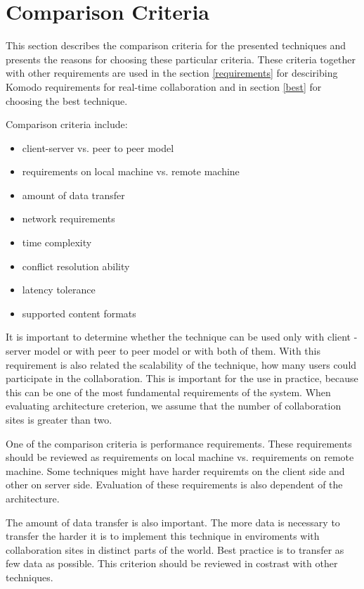 \documentclass[12pt,oneside]{fithesis2}
\begin{document}
\section{Comparison Criteria} \label{comparison}
This section describes the comparison criteria for the presented techniques and presents the reasons for choosing these particular criteria. These criteria together with other requirements are used in the section \ref{requirements} for desciribing Komodo requirements for real-time collaboration and in section \ref{best} for choosing the best technique.
\par Comparison criteria include:
\begin{itemize}
\item client-server vs. peer to peer model
\item requirements on local machine vs. remote machine
\item amount of data transfer
\item network requirements
\item time complexity
\item conflict resolution ability
\item latency tolerance
\item supported content formats
\end{itemize}
\par It is important to determine whether the technique can be used only with client - server model or with peer to peer model or with both of them. With this requirement is also related the scalability of the technique, how many users could participate in the collaboration. This is important for the use in practice, because this can be one of the most fundamental requirements of the system. When evaluating architecture creterion, we assume that the number of collaboration sites is greater than two.
\par One of the comparison criteria is performance requirements. These requirements should be reviewed as requirements on local machine vs. requirements on remote machine. Some techniques might have harder requiremts on the client side and other on server side.  Evaluation of these requirements is also dependent of the architecture.
\par The amount of data transfer is also important. The more data is necessary to transfer the harder it is to implement this technique in enviroments with collaboration sites in distinct parts of the world. Best practice is to transfer as few data as possible. This criterion should be reviewed in costrast with other techniques.
\end{document}
